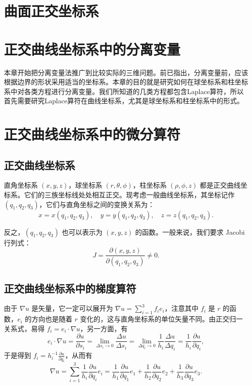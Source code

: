 \section{曲面正交坐标系}
\label{sec:coordinates}

\section{正交曲线坐标系中的分离变量}

本章开始把分离变量法推广到比较实际的三维问题。前已指出，分离变量前，应该根据边界的形状采用适当的坐标系。本章的目的就是研究如何在球坐标系和柱坐标系中对各类方程进行分离变量。我们所知道的几类方程都包含Laplace算符，所以首先需要研究Laplace算符在曲线坐标系，尤其是球坐标系和柱坐标系中的形式。


\section{正交曲线坐标系中的微分算符}

\subsection{正交曲线坐标系}

直角坐标系 $(x, y, z)$，球坐标系 $(r, \theta, \phi)$，柱坐标系 $(\rho, \phi, z)$ 都是正交曲线坐标系。它们的三族坐标线处处相互正交。现考虑一般曲线坐标系，其坐标记作 $(q_1, q_2, q_3)$，它们与直角坐标之间的变换关系为：
\begin{equation}
x = x(q_1, q_2, q_3), \quad y = y(q_1, q_2, q_3), \quad z = z(q_1, q_2, q_3).
\end{equation}

反之，$(q_1, q_2, q_3)$ 也可以表示为 $(x, y, z)$ 的函数。一般来说，我们要求 Jacobi 行列式：
\begin{equation}
J = \frac{\partial (x, y, z)}{\partial (q_1, q_2, q_3)} \neq 0.
\end{equation}

\subsection{正交曲线坐标系中的梯度算符}

由于 $\nabla u$ 是矢量，它一定可以展开为 $\nabla u = \sum_{i=1}^3 f_i e_i$，注意其中 $f_i$ 是 $r$ 的函数，$e_i$ 的方向也是随着 $r$ 变化的，这与直角坐标系的单位矢量不同。由正交归一关系式，易得 $f_i = e_i \cdot \nabla u$，另一方面，有
\begin{equation}
e_i \cdot \nabla u = \frac{\partial u}{\partial s_i} = \lim_{\Delta s_i \to 0} \frac{\Delta u}{\Delta s_i} = \lim_{\Delta q_i \to 0} \frac{1}{h_i} \frac{\Delta u}{\Delta q_i} = \frac{1}{h_i} \frac{\partial u}{\partial q_i},
\end{equation}
于是得到 $f_i = h_i^{-1} \frac{\partial u}{\partial q_i}$，从而有
\begin{equation}
\nabla u = \sum_{i=1}^3 \frac{1}{h_i} \frac{\partial u}{\partial q_i} e_i = \frac{1}{h_1} \frac{\partial u}{\partial q_1} e_1 + \frac{1}{h_2} \frac{\partial u}{\partial q_2} e_2 + \frac{1}{h_3} \frac{\partial u}{\partial q_3} e_3.
\end{equation}

